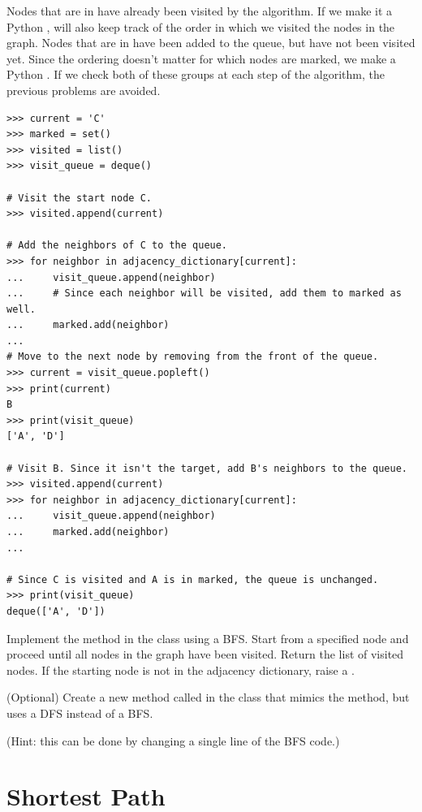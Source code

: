 Nodes that are in  have already been visited by the algorithm.
If we make it a Python ,  will also keep track of the order in which we visited the nodes in the graph.
Nodes that are in  have been added to the queue, but have not been visited yet.
Since the ordering doesn't matter for which nodes are marked, we make  a Python .
If we check both of these groups at each step of the algorithm, the previous problems are avoided.

\begin{lstlisting}
>>> current = 'C'
>>> marked = set()
>>> visited = list()
>>> visit_queue = deque()

# Visit the start node C.
>>> visited.append(current)

# Add the neighbors of C to the queue.
>>> for neighbor in adjacency_dictionary[current]:
...     visit_queue.append(neighbor)
...     # Since each neighbor will be visited, add them to marked as well.
...     marked.add(neighbor) 
...
# Move to the next node by removing from the front of the queue.
>>> current = visit_queue.popleft()
>>> print(current)
B
>>> print(visit_queue)
['A', 'D']

# Visit B. Since it isn't the target, add B's neighbors to the queue.
>>> visited.append(current)
>>> for neighbor in adjacency_dictionary[current]:
...     visit_queue.append(neighbor)
...     marked.add(neighbor) 
...

# Since C is visited and A is in marked, the queue is unchanged.
>>> print(visit_queue)
deque(['A', 'D'])
\end{lstlisting}

\begin{problem}
Implement the  method in the  class using a BFS.
Start from a specified node and proceed until all nodes in the graph have been visited.
Return the list of visited nodes.
If the starting node is not in the adjacency dictionary, raise a .
\end{problem}

\begin{problem}
(Optional) Create a new method called  in the  class
that mimics the  method, but uses a DFS instead of a BFS.

(Hint: this can be done by changing a single line of the BFS code.)
\end{problem}

\section*{Shortest Path}

